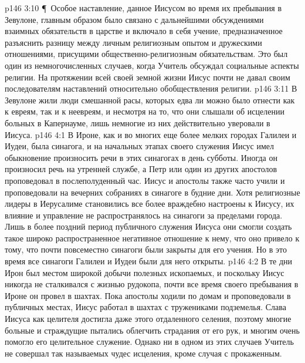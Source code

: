 \vs p146 3:10 \P\ Особое наставление, данное Иисусом во время их пребывания в Зевулоне, главным образом было связано с дальнейшими обсуждениями взаимных обязательств в царстве и включало в себя учение, предназначенное разъяснить разницу между личным религиозным опытом и дружескими отношениями, присущими общественно\hyp{}религиозным обязательствам. Это был один из немногочисленных случаев, когда Учитель обсуждал социальные аспекты религии. На протяжении всей своей земной жизни Иисус почти не давал своим последователям наставлений относительно обобществления религии.
\vs p146 3:11 В Зевулоне жили люди смешанной расы, которых едва ли можно было отнести как к евреям, так и к неевреям, и несмотря на то, что они слышали об исцелении больных в Капернауме, лишь немногие из них действительно уверовали в Иисуса.
\vs p146 4:1 В Ироне, как и во многих еще более мелких городах Галилеи и Иудеи, была синагога, и на начальных этапах своего служения Иисус имел обыкновение произносить речи в этих синагогах в день субботы. Иногда он произносил речь на утренней службе, а Петр или один из других апостолов проповедовал в послеполуденный час. Иисус и апостолы также часто учили и проповедовали на вечерних собраниях в синагоге в будние дни. Хотя религиозные лидеры в Иерусалиме становились все более враждебно настроены к Иисусу, их влияние и управление не распространялось на синагоги за пределами города. Лишь в более поздний период публичного служения Иисуса они смогли создать такое широко распространенное негативное отношение к нему, что оно привело к тому, что почти повсеместно синагоги были закрыты для его учения. Но в это время все синагоги Галилеи и Иудеи были для него открыты.
\vs p146 4:2 В те дни Ирон был местом широкой добычи полезных ископаемых, и поскольку Иисус никогда не сталкивался с жизнью рудокопа, почти все время своего пребывания в Ироне он провел в шахтах. Пока апостолы ходили по домам и проповедовали в публичных местах, Иисус работал в шахтах с тружениками подземелья. Слава Иисуса как целителя достигла даже этого отдаленного селения, поэтому многие больные и страждущие пытались облегчить страдания от его рук, и многим очень помогло его целительное служение. Однако ни в одном из этих случаев Учитель не совершал так называемых чудес исцеления, кроме случая с прокаженным.
